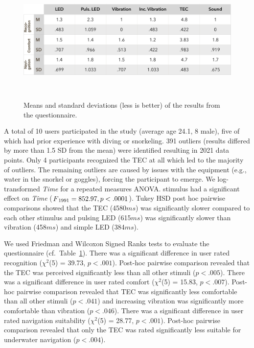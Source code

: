 \begin{figure}
	\includegraphics[width=\columnwidth]{images/m_sd_table_noranking}
	\caption{Means and standard deviations (less is better) of the results from the questionnaire.}~\label{fig:m_sd_table}
\end{figure}

A total of 10 users participated in the study (average age 24.1, 8 male), five of which had prior experience with diving or snorkeling. 
391 outliers (results differed by more than 1.5 SD from the mean) were identified resulting in 2021 data points. 
Only 4 participants recognized the TEC at all which led to the majority of outliers. 
The remaining outliers are caused by issues with the equipment (e.g., water in the snorkel or goggles), forcing the participant to emerge.
We log-transformed \emph{Time} for a repeated measures ANOVA. 
{\sc stimulus} had a significant effect on \emph{Time} ($F\textsubscript{1991} = 852.97, p<.0001$). 
Tukey HSD post hoc pairwise comparisons showed that the TEC (4580$ms$) was significantly slower compared to each other {\sc stimulus} and pulsing LED (615$ms$) was significantly slower than vibration (458$ms$) and simple LED (384$ms$).

We used Friedman and Wilcoxon Signed Ranks tests to evaluate the questionnaire (cf.\ Table~\ref{fig:m_sd_table}).
There was a significant difference in user rated recognition ($\chi^2$(5) = 39.73, $p<.001$).
Post-hoc pairwise comparison revealed that the TEC was perceived significantly less than all other stimuli ($p<.005$). \newline
There was a significant difference in user rated comfort ($\chi^2$(5) = 15.83, $p<.007$).
Post-hoc pairwise comparison revealed that TEC was significantly less comfortable than all other stimuli ($p<.041$) and increasing vibration was significantly more comfortable than vibration ($p<.046$). \newline
There was a significant difference in user rated navigation suitability ($\chi^2$(5) = 28.77, $p<.001$). 
Post-hoc pairwise comparison revealed that only the TEC was rated significantly less suitable for underwater navigation ($p<.004$).

